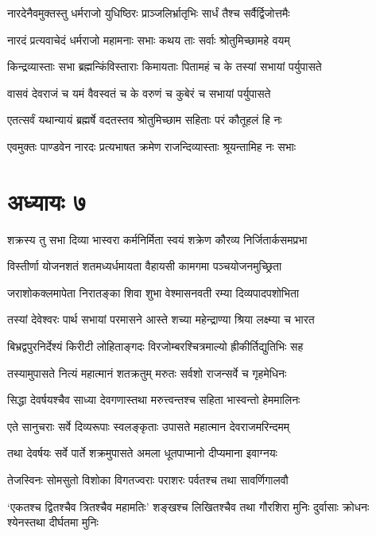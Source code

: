 \twolineshloka
{नारदेनैवमुक्तस्तु धर्मराजो युधिष्ठिरः}
{प्राञ्जलिर्भ्रातृभिः सार्धं तैश्च सर्वैर्द्विजोत्तमैः}


\twolineshloka
{नारदं प्रत्यवाचेदं धर्मराजो महामनाः}
{सभाः कथय ताः सर्वाः श्रोतुमिच्छामहे वयम्}


\twolineshloka
{किन्द्रव्यास्ताः सभा ब्रह्मन्किंविस्ताराः किमायताः}
{पितामहं च के तस्यां सभायां पर्युपासते}


\twolineshloka
{वासवं देवराजं च यमं वैवस्वतं च के}
{वरुणं च कुबेरं च सभायां पर्युपासते}


\twolineshloka
{एतत्सर्वं यथान्यायं ब्रह्मर्षे वदतस्तव}
{श्रोतुमिच्छाम सहिताः परं कौतूहलं हि नः}


\twolineshloka
{एवमुक्तः पाण्डवेन नारदः प्रत्यभाषत}
{क्रमेण राजन्दिव्यास्ताः श्रूयन्तामिह नः सभाः}


\chapter{अध्यायः ७}
\twolineshloka
{शक्रस्य तु सभा दिव्या भास्वरा कर्मनिर्मिता}
{स्वयं शक्रेण कौरव्य निर्जितार्कसमप्रभा}


\threelineshloka
{विस्तीर्णा योजनशतं शतमध्यर्धमायता}
{वैहायसी कामगमा पञ्चयोजनमुच्छ्रिता}
{}


\twolineshloka
{जराशोकक्लमापेता निरातङ्का शिवा शुभा}
{वेश्मासनवती रम्या दिव्यपादपशोभिता}


\threelineshloka
{तस्यां देवेश्वरः पार्थ सभायां परमासने}
{आस्ते शच्या महेन्द्राण्या श्रिया लक्ष्म्या च भारत}
{}


\twolineshloka
{बिभ्रद्वपुरनिर्देश्यं किरीटी लोहिताङ्गदः}
{विरजोम्बरश्चित्रमाल्यो ह्रीकीर्तिद्युतिभिः सह}


\twolineshloka
{तस्यामुपासते नित्यं महात्मानं शतक्रतुम्}
{मरुतः सर्वशो राजन्सर्वे च गृहमेधिनः}


\twolineshloka
{सिद्धा देवर्षयश्चैव साध्या देवगणास्तथा}
{मरुत्त्वन्तश्च सहिता भास्वन्तो हेममालिनः}


\twolineshloka
{एते सानुचराः सर्वे दिव्यरूपाः स्वलङ्कृताः}
{उपासते महात्मान देवराजमरिन्दमम्}


\twolineshloka
{तथा देवर्षयः सर्वे पार्ते शक्रमुपासते}
{अमला धूतपाप्मानो दीप्यमाना इवाग्नयः}


\twolineshloka
{तेजस्विनः सोमसुतो विशोका विगतज्वराः}
{पराशरः पर्वतश्च तथा सावर्णिगालवौ}


\threelineshloka
{`एकतश्च द्वितश्चैव त्रितश्चैव महामतिः'}
{शङ्खश्च लिखितश्चैव तथा गौरशिरा मुनिः}
{दुर्वासाः क्रोधनः श्येनस्तथा दीर्घतमा मुनिः}


